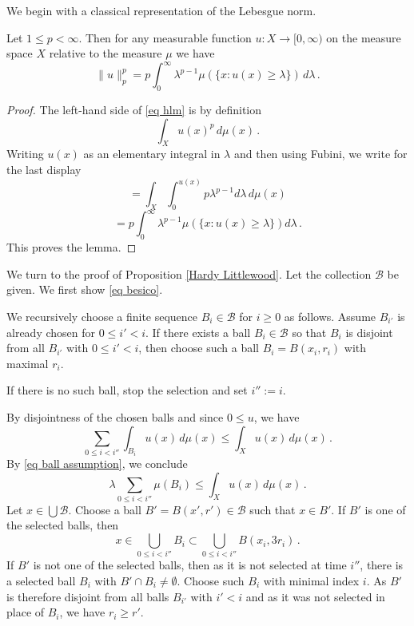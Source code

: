 {We begin with a classical representation of the Lebesgue norm. 
\begin{lemma}\label{lem layercake}
Let $1\le p< \infty$.  Then for any measurable function $u:X\to [0,\infty)$ on the measure space $X$
relative to the measure $\mu$
we have
\begin{equation}\label{eq layercake}
    \|u\|_p^p=p\int_0^\infty \lambda^{p-1}\mu(\{x: u(x)\ge \lambda\})\, d\lambda\, .
\end{equation}
\end{lemma}
\begin{proof}
    The left-hand side of \eqref{eq hlm} is by definition
\begin{equation}
    \int_X u(x)^p \, d\mu(x)\, .\end{equation}
    Writing $u(x)$ as an elementary integral in $\lambda$ and then using Fubini, we write for the last display
    \begin{equation}
    =\int_X \int _0^{u(x)}
    p \lambda^{p-1} d\lambda\, d\mu(x)
\end{equation}
\begin{equation}
 =p\int _0^{\infty}
    \lambda^{p-1} \mu(\{x: u(x)\ge \lambda\}) d\lambda\, .
\end{equation}
This proves the lemma.
\end{proof}

We turn to the proof of Proposition \ref{Hardy Littlewood}.
Let the collection $\mathcal{B}$ be given.
We first show \eqref{eq besico}.



We recursively choose a finite sequence $B_i\in \mathcal{B}$
for $i\ge 0$ as follows. Assume $B_{i'}$
is already chosen for $0\le i'<i$.
If there exists a ball $B_{i}\in \mathcal{B}$ so that $B_{i}$
is disjoint from all $B_{i'}$
with $0\le i'<i$, then choose
such a ball $B_i=B(x_i,r_i)$ with maximal $r_i$.

If there is no such ball, stop the selection and set
$i'':=i$.

By  disjointness of the chosen balls and since $0 \le u$, we have
\begin{equation}
\sum_{0\le i<i''}\int_{B_i} u(x)\, d\mu(x) \le \int_X  u(x)\, d\mu(x)\, .
\end{equation}
By \eqref{eq ball assumption}, we conclude
\begin{equation}\label{eqbes1}
\lambda \sum_{0\le i<i''}\mu(B_i)
\le  \int_X  u(x)\, d\mu(x)\, .
\end{equation}
Let $x\in \bigcup \mathcal{B}$.
Choose a ball $B'=B(x',r')\in \mathcal{B}$
such that $x\in B'$.
If $B'$ is one of the selected balls, then
\begin{equation}\label{3rone}
    x\in \bigcup _{0\le i< i''}B_i\subset \bigcup _{0\le i< i''}B(x_i,3r_i)\, .
\end{equation}
If $B'$ is not one of the selected balls, then as it is not selected at time $i''$, there is a selected ball $B_i$  with
$B'\cap B_i\neq \emptyset$.
Choose such $B_i$ with minimal index $i$. As $B'$ is therefore disjoint from all
balls $B_{i'}$ with $i'<i$ and
as it was not selected in place of $B_i$, we have $r_i\ge r'$.

}

